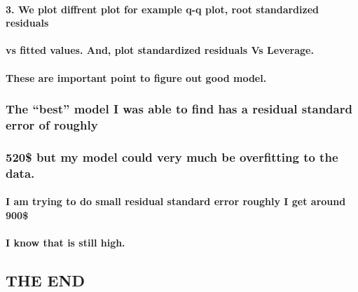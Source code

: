 \documentclass[
]{article}
\begin{document}
\hypertarget{we-plot-diffrent-plot-for-example-q-q-plot-root-standardized-residuals}{%
\paragraph{3. We plot diffrent plot for example q-q plot, root
standardized
residuals}\label{we-plot-diffrent-plot-for-example-q-q-plot-root-standardized-residuals}}

\hypertarget{vs-fitted-values.-and-plot-standardized-residuals-vs-leverage.}{%
\paragraph{vs fitted values. And, plot standardized residuals Vs
Leverage.}\label{vs-fitted-values.-and-plot-standardized-residuals-vs-leverage.}}

\hypertarget{these-are-important-point-to-figure-out-good-model.}{%
\paragraph{These are important point to figure out good
model.}\label{these-are-important-point-to-figure-out-good-model.}}

\hypertarget{the-best-model-i-was-able-to-find-has-a-residual-standard-error-of-roughly}{%
\subsubsection{The ``best'' model I was able to find has a residual
standard error of
roughly}\label{the-best-model-i-was-able-to-find-has-a-residual-standard-error-of-roughly}}

\hypertarget{but-my-model-could-very-much-be-overfitting-to-the-data.}{%
\subsubsection{520\$ but my model could very much be overfitting to the
data.}\label{but-my-model-could-very-much-be-overfitting-to-the-data.}}

\hypertarget{i-am-trying-to-do-small-residual-standard-error-roughly-i-get-around-900}{%
\paragraph{I am trying to do small residual standard error roughly I get
around
900\$}\label{i-am-trying-to-do-small-residual-standard-error-roughly-i-get-around-900}}

\hypertarget{i-know-that-is-still-high.}{%
\paragraph{I know that is still
high.}\label{i-know-that-is-still-high.}}

\hypertarget{the-end}{%
\subsection{THE END}\label{the-end}}
\end{document}
